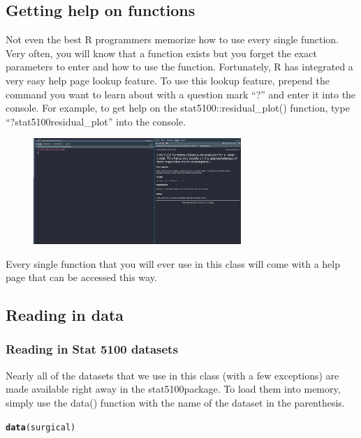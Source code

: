 \documentclass{article}\usepackage[]{graphicx}\usepackage[]{color}
\makeatletter
\newcommand{\hlstd}[1]{\textcolor[rgb]{0.345,0.345,0.345}{#1}}%
\newcommand{\hlkwd}[1]{\textcolor[rgb]{0.737,0.353,0.396}{\textbf{#1}}}%
\newenvironment{kframe}{%
 \def\at@end@of@kframe{}%
 \ifinner\ifhmode%
  \def\at@end@of@kframe{\end{minipage}}%
  \begin{minipage}{\columnwidth}%
 \fi\fi%
 \def\FrameCommand##1{\hskip\@totalleftmargin \hskip-\fboxsep
 \colorbox{shadecolor}{##1}\hskip-\fboxsep
     \hskip-\linewidth \hskip-\@totalleftmargin \hskip\columnwidth}%
 \MakeFramed {\advance\hsize-\width
   \@totalleftmargin\z@ \linewidth\hsize
   \@setminipage}}%
 {\par\unskip\endMakeFramed%
 \at@end@of@kframe}
\newenvironment{knitrout}{}{} %
\makeatother
\begin{document}
\subsection{Getting help on functions}

Not even the best R programmers memorize how to use every single function. Very often, you will know that a function exists but you forget the exact parameters to enter and how to use the function. Fortunately, R has integrated a very easy help page lookup feature. To use this lookup feature, prepend the command you want to learn about with a question mark ``?'' and enter it into the console. For example, to get help on the stat5100::residual\_plot() function, type ``?stat5100residual\_plot'' into the console.

\begin{figure}[H]
  \centering
  \includegraphics[width = 0.70\textwidth]{../figures/module1/rgettinghelp.png}
\end{figure}

Every single function that you will ever use in this class will come with a help page that can be accessed this way.

\subsection{Reading in data}
\subsubsection{Reading in Stat 5100 datasets}

Nearly all of the datasets that we use in this class (with a few exceptions) are made available right away in the stat5100package. To load them into memory, simply use the data() function with the name of the dataset in the parenthesis.

\begin{knitrout}
\color{fgcolor}\begin{kframe}
\begin{alltt}
\hlkwd{data}\hlstd{(surgical)}
\end{alltt}
\end{kframe}
\end{knitrout}
\end{document}
